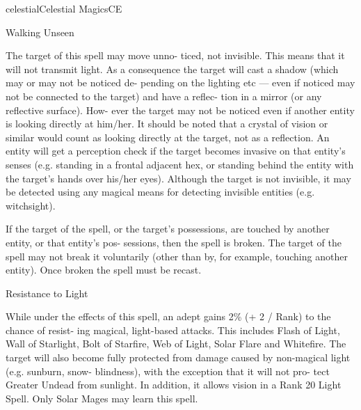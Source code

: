 \begin{College}[1.3]{celestial}{Celestial Magics}{CE}
\begin{spell}[G-8]{Walking Unseen }
\begin{effects}
 The  target  of  this  spell  may  move  unno-
ticed,  not  invisible.  This  means  that  it  will  not 
transmit light. As a consequence the target will cast 
a  shadow  (which  may  or  may  not  be  noticed  de-
pending on the lighting etc — even if noticed may 
not  be  connected  to  the  target)  and  have  a  reflec-
tion  in  a  mirror  (or  any  reflective  surface).  How-
ever  the  target  may  not be noticed  even  if  another 
entity  is  looking  directly  at  him/her.  It  should  be 
noted  that  a  crystal  of  vision  or  similar  would 
count  as  looking  directly  at  the  target,  not  as  a 
reflection.  An  entity  will  get  a  perception check if 
the target becomes invasive on that entity’s senses 
(e.g. standing in a frontal adjacent hex, or standing 
behind  the  entity  with  the  target’s  hands  over 
his/her eyes). Although the target is not invisible, it 
may  be  detected  using  any  magical  means  for 
detecting invisible entities (e.g. witchsight). 

If the target of the spell, or the target’s possessions, 
are  touched  by  another  entity,  or  that  entity’s  pos-
sessions, then the spell is broken. The target of the 
spell  may  not  break  it  voluntarily  (other  than  by, 
for example, touching another entity). Once broken 
the spell must be recast. 
\end{effects}
\end{spell}

\begin{spell}[G-9 Solar]{Resistance to Light}

\begin{effects}
 While  under  the  effects  of  this  spell,  an 
adept gains 2\% (+ 2 / Rank) to the chance of resist-
ing  magical,  light-based  attacks.  This  includes 
Flash  of  Light,  Wall  of  Starlight,  Bolt  of  Starfire, 
Web of Light, Solar Flare and Whitefire. The target 
will  also  become  fully  protected  from  damage 
caused  by  non-magical  light  (e.g.  sunburn,  snow-
blindness),  with  the  exception  that  it  will  not  pro-
tect  Greater  Undead  from  sunlight.  In  addition,  it 
allows vision in a Rank 20 Light Spell. Only Solar 
Mages may learn this spell. 
\end{effects}
\end{spell}


\end{College}
